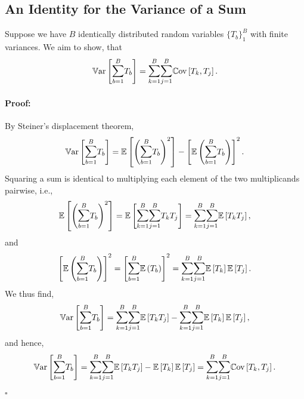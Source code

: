 \documentclass[a4paper,12pt, headsepline]{scrartcl}
\newenvironment{proof}{\paragraph{Proof:}}{\hfill$\square$}
\numberwithin{equation}{section}
\begin{document}
 \subsection{An Identity for the Variance of a Sum}\label{App:A4}
 Suppose we have $B$ identically distributed random variables $\{T_b\}_1^B$ with finite variances. We aim to show, that
 \[
 \mathbb{V}\text{ar} \left[ \mathlarger{\sum}\limits_{b = 1}^B T_b \right]= \mathlarger{\sum}\limits_{k = 1}^B \mathlarger{\sum}\limits_{j = 1}^B \mathbb{C}\text{ov} \left[T_k, T_j \right].
 \]
 \begin{proof}
 	By Steiner's displacement theorem,
 	\[
 	\mathbb{V}\text{ar} \left[ \mathlarger{\sum}\limits_{b = 1}^B T_b \right] = \mathbb{E}\left[\left(\mathlarger{\sum}\limits_{b = 1}^B T_b\right)^2\right] - \left[\mathbb{E}\left(\mathlarger{\sum}\limits_{b = 1}^B T_b\right)\right]^2.
 	\]
 	Squaring a sum is identical to multiplying each element of the two multiplicands pairwise, i.e.,
 	\[
 	\mathbb{E}\left[\left(\mathlarger{\sum}\limits_{b = 1}^B T_b\right)^2\right] = 	\mathbb{E}\left[\mathlarger{\sum}\limits_{k = 1}^B \mathlarger{\sum}\limits_{j = 1}^B T_k T_j \right] = \mathlarger{\sum}\limits_{k = 1}^B \mathlarger{\sum}\limits_{j = 1}^B \mathbb{E}\left[T_k T_j\right], 
 	\]
 	and
 	\[
 	\left[\mathbb{E}\left(\mathlarger{\sum}\limits_{b = 1}^B T_b\right)\right]^2 = 
 	\left[\mathlarger{\sum}\limits_{b = 1}^B \mathbb{E}\left(T_b\right)\right]^2 = 
 	\mathlarger{\sum}\limits_{k = 1}^B \mathlarger{\sum}\limits_{j = 1}^B \mathbb{E}\left[T_k \right] \mathbb{E}\left[ T_j \right].
 	\]
 	We thus find,
 	\[
 	\mathbb{V}\text{ar} \left[ \mathlarger{\sum}\limits_{b = 1}^B T_b \right] =
 	\mathlarger{\sum}\limits_{k = 1}^B \mathlarger{\sum}\limits_{j = 1}^B \mathbb{E}\left[T_k T_j\right] - \mathlarger{\sum}\limits_{k = 1}^B \mathlarger{\sum}\limits_{j = 1}^B \mathbb{E}\left[ T_k \right] \mathbb{E}\left[ T_j \right],
 	\]
 	and hence,
 	\[
 	\mathbb{V}\text{ar} \left[ \mathlarger{\sum}\limits_{b = 1}^B T_b \right] =
 	\mathlarger{\sum}\limits_{k = 1}^B \mathlarger{\sum}\limits_{j = 1}^B \mathbb{E}\left[T_k T_j\right] - \mathbb{E}\left[ T_k \right] \mathbb{E}\left[ T_j \right] = \mathlarger{\sum}\limits_{k = 1}^B \mathlarger{\sum}\limits_{j = 1}^B \mathbb{C}\text{ov} \left[T_k, T_j \right].
 	\]
 \end{proof}
\end{document}
